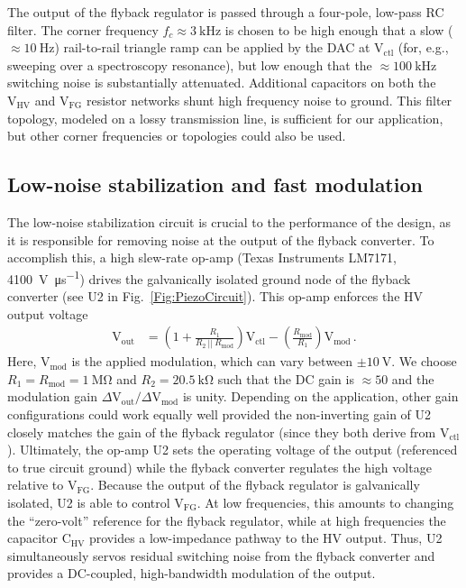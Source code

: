 \documentclass[aip,rsi,reprint]{revtex4-1} %
\begin{document}
The output of the flyback regulator is passed through a four-pole, low-pass RC filter.
The corner frequency $f_c \approx \SI{3}{\kilo\hertz}$ is chosen to be high enough that a slow ($\approx \SI{10}{\hertz}$) rail-to-rail triangle ramp can be applied by the DAC at $\text{V}_\text{ctl}$ (for, e.g., sweeping over a spectroscopy resonance), but low enough that the $\approx \SI{100}{\kilo\hertz}$ switching noise is substantially attenuated.
Additional capacitors on both the $\text{V}_\text{HV}$ and $\text{V}_\text{FG}$ resistor networks shunt high frequency noise to ground.
This filter topology, modeled on a lossy transmission line, is sufficient for our application, but other corner frequencies or topologies could also be used.

\subsection{Low-noise stabilization and fast modulation}
\label{Sec:LowNoiseStabilization}

The low-noise stabilization circuit is crucial to the performance of the design, as it is responsible for removing noise at the output of the flyback converter.
To accomplish this, a high slew-rate op-amp (Texas Instruments LM7171, \SI[per-mode=symbol]{4100}{\volt\per\micro\second}) drives the galvanically isolated ground node of the flyback converter (see U2 in Fig.~\ref{Fig:PiezoCircuit}).
This op-amp enforces the HV output voltage
\begin{align}
\text{V}_\text{out} &= \left(1 + \frac{R_1}{R_2~||~R_\text{mod}}\right) \text{V}_\text{ctl} -
\left(\frac{R_\text{mod}}{R_1}\right) \text{V}_\text{mod}\,.
\label{Eq:FullTransferFunc}
\end{align}
Here, $\text{V}_\text{mod}$ is the applied modulation, which can vary between $\pm\SI{10}{\volt}$.
We choose $R_1 = R_\text{mod} = \SI{1}{\mega\ohm}$ and $R_2 = \SI{20.5}{\kilo\ohm}$ such that the DC gain is $\approx 50$ and the modulation gain $\Delta\text{V}_\text{out}/\Delta\text{V}_\text{mod}$ is unity.
Depending on the application, other gain configurations could work equally well provided the non-inverting gain of U2 closely matches the gain of the flyback regulator (since they both derive from $\text{V}_\text{ctl}$).
Ultimately, the op-amp U2 sets the operating voltage of the output (referenced to true circuit ground) while the flyback converter regulates the high voltage relative to $\text{V}_\text{FG}$.
Because the output of the flyback regulator is galvanically isolated, U2 is able to control $\text{V}_\text{FG}$. 
At low frequencies, this amounts to changing the ``zero-volt'' reference for the flyback regulator, while at high frequencies the capacitor $\text{C}_\text{HV}$ provides a low-impedance pathway to the HV output.
Thus, U2 simultaneously servos residual switching noise from the flyback converter and provides a DC-coupled, high-bandwidth modulation of the output.
\end{document}

